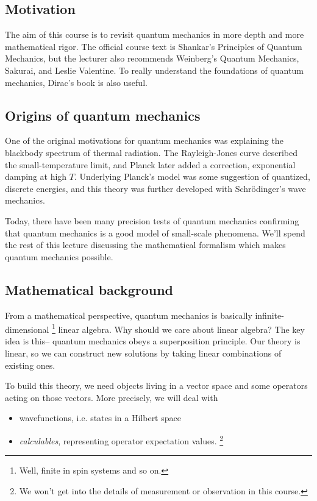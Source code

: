 \subsection*{Motivation}
The aim of this course is to revisit quantum mechanics in more depth and more mathematical rigor. The official course text is Shankar's Principles of Quantum Mechanics, but the lecturer also recommends Weinberg's Quantum Mechanics, Sakurai, and Leslie Valentine. To really understand the foundations of quantum mechanics, Dirac's book is also useful.

\subsection*{Origins of quantum mechanics}
One of the original motivations for quantum mechanics was explaining the blackbody spectrum of thermal radiation. The Rayleigh-Jones curve described the small-temperature limit, and Planck later added a correction, exponential damping at high $T$. Underlying Planck's model was some suggestion of quantized, discrete energies, and this theory was further developed with Schr\"odinger's wave mechanics.

Today, there have been many precision tests of quantum mechanics confirming that quantum mechanics is a good model of small-scale phenomena. We'll spend the rest of this lecture discussing the mathematical formalism which makes quantum mechanics possible.

\subsection*{Mathematical background}
From a mathematical perspective, quantum mechanics is basically infinite-dimensional%
    \footnote{Well, finite in spin systems and so on.}
linear algebra. Why should we care about linear algebra? The key idea is this-- quantum mechanics obeys a superposition principle. Our theory is linear, so we can construct new solutions by taking linear combinations of existing ones.

To build this theory, we need objects living in a vector space and some operators acting on those vectors. More precisely, we will deal with 
\begin{itemize}
    \item wavefunctions, i.e. states in a Hilbert space
    \item \emph{calculables}, representing operator expectation values.%
        \footnote{We won't get into the details of measurement or observation in this course.}
\end{itemize}

